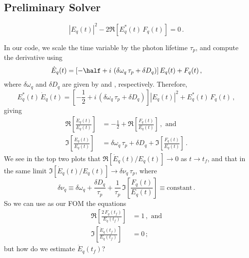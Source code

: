 \subsection{Preliminary Solver}
\begin{equation}
  \left|E_q(t)\right|^2 -2 \Re\left[E_q^\ast(t)\, F_q(t)\right] = 0\, .
\end{equation}

In our code, we scale the time variable by the photon lifetime $\tau_p$, and compute the derivative using
\begin{equation}
  \dot{E}_q(t) = \left[-\half + i\, \left(\delta \omega_q\, \tau_p + \delta D_q\right)\right] E_q(t) + F_q(t)\, ,
\end{equation}
where $\delta \omega_q$ and $\delta D_q$ are given by  and , respectively.
Therefore,
\begin{equation}
  E^\ast_q(t)\, \dot{E}_q(t) = \left[-\frac{1}{2} + i\, \left(\delta \omega_q\, \tau_p + \delta D_q\right)\right] \left|E_q(t)\right|^2 + E^\ast_q(t)\, F_q(t)\, ,
\end{equation}
giving
\begin{align}
  \Re\left[ \frac{\dot{E}_q(t)}{E_q(t)} \right] &= -\frac{1}{2} + \Re\left[ \frac{F_q(t)}{E_q(t)} \right]\, , \text{ and} \\
  \Im\left[ \frac{\dot{E}_q(t)}{E_q(t)} \right] &= \delta \omega_q\, \tau_p + \delta D_q + \Im\left[ \frac{F_q(t)}{E_q(t)} \right]\, .
\end{align}
We see in the top two plots that $\Re[\dot{E}_q(t) / E_q(t)] \longrightarrow 0$ as $t \longrightarrow t_f$, and that in the same limit $\Im[\dot{E}_q(t) / E_q(t)] \longrightarrow \delta \nu_q\, \tau_p$, where
\begin{equation}
  \delta \nu_q \equiv \delta \omega_q + \frac{\delta D_q}{\tau_p} + \frac{1}{\tau_p}\, \Im\left[ \frac{F_q(t)}{E_q(t)} \right] \equiv \text{constant}\, .
\end{equation}
So we can use as our FOM the equations
\begin{align}
  \Re\left[ \frac{2\, F_q(t_f)}{E_q(t_f)} \right] &= 1\, , \text{ and} \\
  \Im\left[ \frac{\ddot{E}_q(t_f)}{E_q(t_f)} \right] &= 0\, ;
\end{align}
but how do we estimate $\ddot{E}_q(t_f)$?

